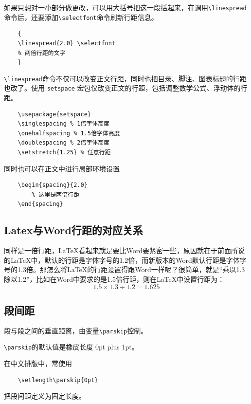 如果只想对一小部分做更改，可以用大括号把这一段括起来，在调用\verb|\linespread|命令后，还要添加\verb|\selectfont|命令刷新行距信息。

\begin{lstlisting}
    {
    \linespread{2.0} \selectfont
    % 两倍行距的文字
    }
\end{lstlisting}

\verb|\linespread|命令不仅可以改变正文行距，同时也把目录、脚注、图表标题的行距也改了。使用 \verb|setspace| 宏包仅改变正文的行距，包括调整数学公式、浮动体的行距。

\begin{lstlisting}
    \usepackage{setspace}
    \singlespacing % 1倍字体高度
    \onehalfspacing % 1.5倍字体高度
    \doublespacing % 2倍字体高度
    \setstretch{1.25} % 任意行距
\end{lstlisting}

同时也可以在正文中进行局部环境设置

\begin{lstlisting}
    \begin{spacing}{2.0}
        % 这里是两倍行距
    \end{spacing}
\end{lstlisting}

\subsection{Latex与Word行距的对应关系}

同样是一倍行距，LaTeX看起来就是要比Word要紧密一些，原因就在于前面所说的LaTeX中，默认的行距是字体字号的1.2倍，而新版本的Word默认行距是字体字号的1.3倍。那怎么将LaTeX的行距设置得跟Word一样呢？很简单，就是“乘以1.3除以1.2”，比如在Word中要求的是1.5倍行距，则在LaTeX中设置行距为：
\[
    1.5 \times 1.3\div 1.2=1.625
\]

\subsection{段间距}

段与段之间的垂直距离，由变量\verb|\parskip|控制。

\verb|\parskip|的默认值是橡皮长度 0pt plus 1pt。

在中文排版中，常使用

\begin{lstlisting}
    \setlength\parskip{0pt}
\end{lstlisting}

把段间距定义为固定长度。


